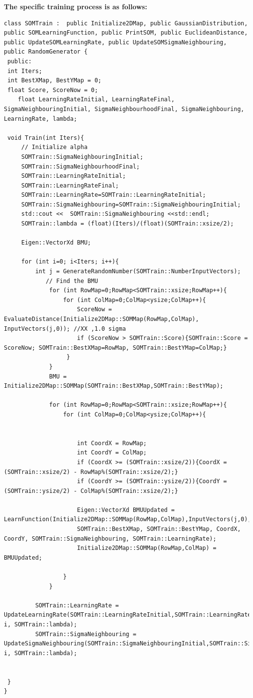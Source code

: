 \documentclass[11pt]{article}
\begin{document}
\textbf{The specific training process is as follows:}
\begin{lstlisting}
class SOMTrain :  public Initialize2DMap, public GaussianDistribution,
public SOMLearningFunction, public PrintSOM, public EuclideanDistance, public UpdateSOMLearningRate, public UpdateSOMSigmaNeighbouring, public RandomGenerator {
 public:
 int Iters;
 int BestXMap, BestYMap = 0;
 float Score, ScoreNow = 0;
    float LearningRateInitial, LearningRateFinal, SigmaNeighbouringInitial, SigmaNeighbourhoodFinal, SigmaNeighbouring, LearningRate, lambda;
     
 void Train(int Iters){
     // Initialize alpha
     SOMTrain::SigmaNeighbouringInitial;
     SOMTrain::SigmaNeighbourhoodFinal;
     SOMTrain::LearningRateInitial;
     SOMTrain::LearningRateFinal;
     SOMTrain::LearningRate=SOMTrain::LearningRateInitial;
     SOMTrain::SigmaNeighbouring=SOMTrain::SigmaNeighbouringInitial;
     std::cout <<  SOMTrain::SigmaNeighbouring <<std::endl;
     SOMTrain::lambda = (float)(Iters)/(float)(SOMTrain::xsize/2);
     
     Eigen::VectorXd BMU;
     
     for (int i=0; i<Iters; i++){
         int j = GenerateRandomNumber(SOMTrain::NumberInputVectors);
            // Find the BMU
             for (int RowMap=0;RowMap<SOMTrain::xsize;RowMap++){
                 for (int ColMap=0;ColMap<ysize;ColMap++){
                     ScoreNow = EvaluateDistance(Initialize2DMap::SOMMap(RowMap,ColMap), InputVectors(j,0)); //XX ,1.0 sigma
                     if (ScoreNow > SOMTrain::Score){SOMTrain::Score = ScoreNow; SOMTrain::BestXMap=RowMap, SOMTrain::BestYMap=ColMap;}
                  }
             }
             BMU = Initialize2DMap::SOMMap(SOMTrain::BestXMap,SOMTrain::BestYMap);

             for (int RowMap=0;RowMap<SOMTrain::xsize;RowMap++){
                 for (int ColMap=0;ColMap<ysize;ColMap++){
                     
                     
                     int CoordX = RowMap;
                     int CoordY = ColMap;
                     if (CoordX >= (SOMTrain::xsize/2)){CoordX = (SOMTrain::xsize/2) - RowMap%(SOMTrain::xsize/2);}
                     if (CoordY >= (SOMTrain::ysize/2)){CoordY = (SOMTrain::ysize/2) - ColMap%(SOMTrain::xsize/2);}

                     Eigen::VectorXd BMUUpdated = LearnFunction(Initialize2DMap::SOMMap(RowMap,ColMap),InputVectors(j,0),
                     SOMTrain::BestXMap, SOMTrain::BestYMap, CoordX, CoordY, SOMTrain::SigmaNeighbouring, SOMTrain::LearningRate);
                     Initialize2DMap::SOMMap(RowMap,ColMap) = BMUUpdated;

                 }
             }

         SOMTrain::LearningRate = UpdateLearningRate(SOMTrain::LearningRateInitial,SOMTrain::LearningRateFinal, i, SOMTrain::lambda);
         SOMTrain::SigmaNeighbouring = UpdateSigmaNeighbouring(SOMTrain::SigmaNeighbouringInitial,SOMTrain::SigmaNeighbourhoodFinal,  i, SOMTrain::lambda);
         
         
 }
}
\end{lstlisting}
\end{document}
